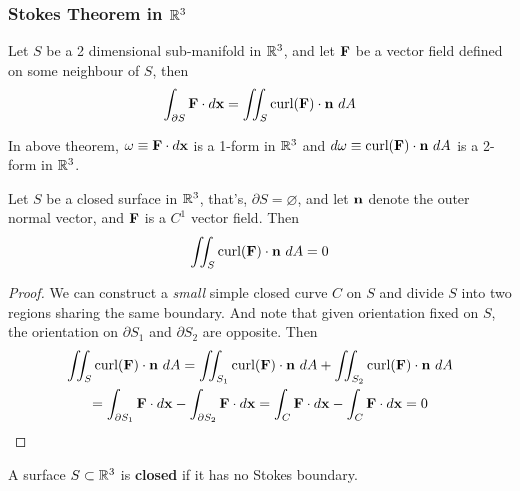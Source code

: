 \documentclass[11pt]{article}
\begin{document}
		\subsubsection{Stokes Theorem in $\mathbb{R}^3$}
			\begin{theorem}
				Let $S$ be a 2 dimensional sub-manifold in $\mathbb{R}^3$, and let $\textbf{F}$ be a vector field defined on some neighbour of $S$, then
				\begin{equation}
					\int_{\partial S} \textbf{F}\cdot d\textbf{x} = \iint_S \text{curl}(\textbf{F})\cdot \textbf{n}\ dA
				\end{equation}
			\end{theorem}
			
			\begin{remark}
				In above theorem, $\omega \equiv \textbf{F} \cdot d \textbf{x}$ is a 1-form in $\mathbb{R}^3$ and $d \omega \equiv \text{curl}(\textbf{F}) \cdot \textbf{n}\ dA$ is a 2-form in $\mathbb{R}^3$.
			\end{remark}
			
			\begin{corollary}
				Let $S$ be a closed surface in $\mathbb{R}^3$, that's, $\partial S = \varnothing$, and let $\textbf{n}$ denote the outer normal vector, and $\textbf{F}$ is a $C^1$ vector field. Then
				\begin{equation}
					\iint_S \text{curl}(\textbf{F}) \cdot \textbf{n}\ dA = 0
				\end{equation}
				\begin{proof}
					We can construct a \emph{small} simple closed curve $C$ on $S$ and divide $S$ into two regions sharing the same boundary. And note that given orientation fixed on $S$, the orientation on $\partial S_1$ and $\partial S_2$ are opposite. Then
					\begin{gather}
						\iint_S \text{curl}(\textbf{F})\cdot \textbf{n}\ dA = \iint_{S_1} \text{curl}(\textbf{F})\cdot \textbf{n}\ dA + \iint_{S_2} \text{curl}(\textbf{F})\cdot \textbf{n}\ dA \\
						= \int_{\partial S_1} \textbf{F} \cdot d\textbf{x} - \int_{\partial S_2} \textbf{F} \cdot d\textbf{x}
						= \int_{C} \textbf{F} \cdot d\textbf{x} - \int_{C} \textbf{F} \cdot d\textbf{x} = 0
					\end{gather}
				\end{proof}
			\end{corollary}
			
			\begin{definition}
				A surface $S \subset \mathbb{R}^3$ is \textbf{closed} if it has no Stokes boundary.
			\end{definition}
			
\end{document}
